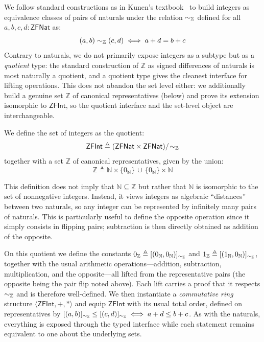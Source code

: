 We follow standard constructions as in Kunen's textbook~\cite[Ch.~1, Sec.~11]{kunen2011set} to build integers as equivalence classes of pairs of naturals under the relation \(\sim_{\mathbb{Z}}\) defined for all $a,b,c,d : \mathsf{ZFNat}$ as:
\[
  (a,b) \sim_{\mathbb{Z}} (c,d) \iff a + d = b + c
\]
Contrary to naturals, we do not primarily expose integers as a subtype but as a \emph{quotient} type: the standard construction of $\mathbb{Z}$ as signed differences of naturals is most naturally a quotient, and a quotient type gives the cleanest interface for lifting operations.
This does not abandon the set level either: we additionally build a genuine set $\mathbb{Z}$ of canonical representatives (below) and prove its extension isomorphic to $\mathsf{ZFInt}$, so the quotient interface and the set-level object are interchangeable.
\begin{definition}
  We define the set of integers as the quotient:
  \[
    \mathsf{ZFInt} \triangleq (\mathsf{ZFNat} \times \mathsf{ZFNat})/\!\sim_{\mathbb{Z}}
  \]
  together with a set $\mathbb{Z}$ of canonical representatives, given by the union:
  \[
    \mathbb{Z} \triangleq \mathbb{N} \times \{0_{\mathbb{N}}\}\, \cup\, \{0_{\mathbb{N}}\} \times \mathbb{N}
  \]
\end{definition}

\begin{remark}%
  This definition does not imply that $\mathbb{N} \subseteq \mathbb{Z}$
  but rather that $\mathbb{N}$ is isomorphic to the set of nonnegative integers.
  Instead, it views integers as algebraic ``distances'' between two naturals, so any integer can be represented by infinitely many pairs of naturals.
  This is particularly useful to define the opposite operation since it simply consists in flipping pairs; subtraction is then directly obtained as addition of the opposite.
\end{remark}

On this quotient we define the constants $0_{\mathbb{Z}} \triangleq [(0_{\mathbb{N}}, 0_{\mathbb{N}})]_{\sim_{\mathbb{Z}}}$ and $1_{\mathbb{Z}} \triangleq [(1_{\mathbb{N}}, 0_{\mathbb{N}})]_{\sim_{\mathbb{Z}}}$, together with the usual arithmetic operations---addition, subtraction, multiplication, and the opposite---all lifted from the representative pairs (the opposite being the pair flip noted above).
Each lift carries a proof that it respects $\sim_{\mathbb{Z}}$ and is therefore well-defined.
We then instantiate a \emph{commutative ring} structure $\langle \mathsf{ZFInt}, +, * \rangle$ and equip $\mathsf{ZFInt}$ with its usual total order, defined on representatives by $[(a,b)]_{\sim_{\mathbb{Z}}} \le [(c,d)]_{\sim_{\mathbb{Z}}} \iff a + d \le b + c$.
As with the naturals, everything is exposed through the typed interface while each statement remains equivalent to one about the underlying sets.

